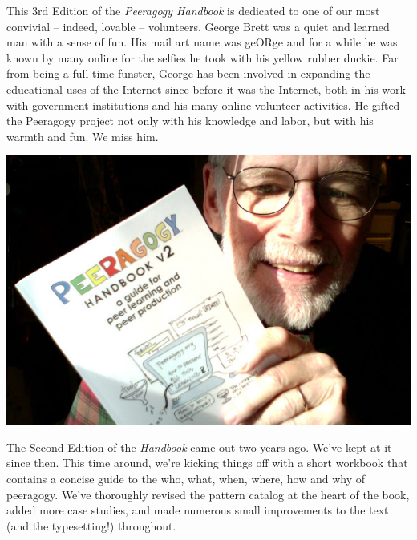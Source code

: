 This 3rd Edition of the \emph{Peeragogy Handbook} is dedicated to one of
our most convivial -- indeed, lovable -- volunteers. George Brett was a
quiet and learned man with a sense of fun. His mail art name was geORge
and for a while he was known by many online for the selfies he took with
his yellow rubber duckie. Far from being a full-time funster, George has
been involved in expanding the educational uses of the Internet since
before it was the Internet, both in his work with government
institutions and his many online volunteer activities. He gifted the
Peeragogy project not only with his knowledge and labor, but with his
warmth and fun. We miss him.

\includegraphics{../pictures/george.jpg}

The Second Edition of the \emph{Handbook} came out two years ago. We've
kept at it since then. This time around, we're kicking things off with a
short workbook that contains a concise guide to the who, what, when,
where, how and why of peeragogy. We've thoroughly revised the pattern
catalog at the heart of the book, added more case studies, and made
numerous small improvements to the text (and the typesetting!)
throughout.
